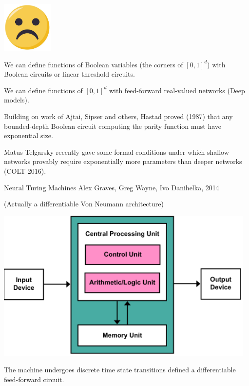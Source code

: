 {\vfill
\centerline{\includegraphics[height = 1in]{../images/Frown}}


We can define functions of Boolean variables (the corners of $[0,1]^d$) with Boolean circuits or linear threshold circuits.

\vfill
We can define functions of $[0,1]^d$ with feed-forward real-valued networks (Deep models).


Building on work of Ajtai, Sipser and others, Hastad proved (1987) that any bounded-depth Boolean circuit computing the parity function must have exponential size. 

\vfill
Matus Telgarsky recently gave some formal conditions under which shallow networks provably require exponentially more parameters than deeper networks (COLT 2016).


Neural Turing Machines
Alex Graves, Greg Wayne, Ivo Danihelka, 2014

\vfill
(Actually a differentiable Von Neumann architecture)

\vfill
\centerline{\includegraphics[height = 3in]{../images/VNA}}

\vfill
The machine undergoes discrete time state transitions defined a differentiable feed-forward circuit.


}

